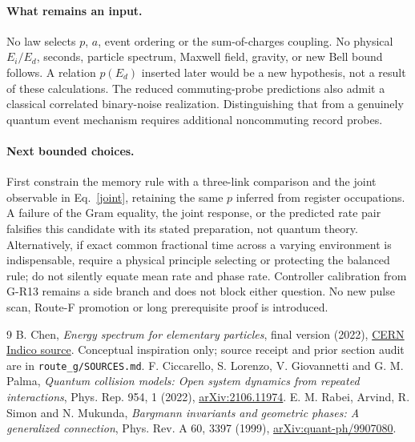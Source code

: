 \documentclass[11pt,a4paper]{article}
\begin{document}
\paragraph{What remains an input.}
No law selects $p$, $a$, event ordering or the sum-of-charges coupling.
No physical $E_i/E_d$, seconds, particle spectrum, Maxwell field,
gravity, or new Bell bound follows. A relation $p(E_d)$ inserted later
would be a new hypothesis, not a result of these calculations. The
reduced commuting-probe predictions also admit a classical correlated
binary-noise realization. Distinguishing that from a genuinely quantum
event mechanism requires additional noncommuting record probes.

\paragraph{Next bounded choices.}
First constrain the memory rule with a three-link comparison and the
joint observable in Eq.~\eqref{joint}, retaining the same $p$ inferred
from register occupations. A failure of the Gram equality, the joint
response, or the predicted rate pair falsifies this candidate with its
stated preparation, not quantum theory. Alternatively, if exact common
fractional time across a varying environment is indispensable, require
a physical principle selecting or protecting the balanced rule; do not
silently equate mean rate and phase rate. Controller calibration from
G-R13 remains a side branch and does not block either question. No new
pulse scan, Route-F promotion or long prerequisite proof is introduced.

\begingroup\small
\begin{thebibliography}{9}
 B. Chen, \emph{Energy spectrum for elementary particles},
final version (2022), \href{https://indico.cern.ch/event/1109513/contributions/4969967/attachments/2480973/4410560/Energy\%20spectrum\%20for\%20elementary\%20particles_final.pdf}{CERN Indico source}.
Conceptual inspiration only; source receipt and prior section audit are in
\texttt{route\_g/SOURCES.md}.
 F. Ciccarello, S. Lorenzo, V. Giovannetti and G. M. Palma,
\emph{Quantum collision models: Open system dynamics from repeated interactions},
Phys. Rep. 954, 1 (2022), \href{https://arxiv.org/abs/2106.11974}{arXiv:2106.11974}.
 E. M. Rabei, Arvind, R. Simon and N. Mukunda,
\emph{Bargmann invariants and geometric phases: A generalized connection},
Phys. Rev. A 60, 3397 (1999),
\href{https://arxiv.org/abs/quant-ph/9907080}{arXiv:quant-ph/9907080}.
\end{thebibliography}
\endgroup
\end{document}
